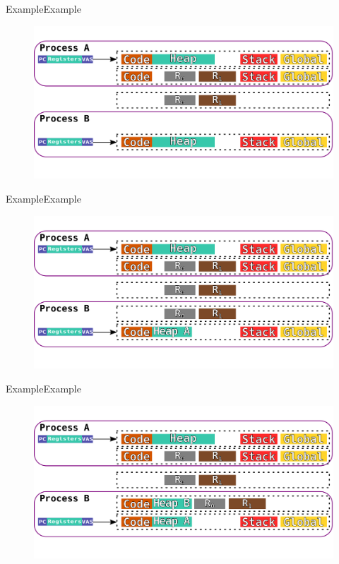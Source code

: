 \documentclass[10pt]{beamer}
\begin{document}
\begin{frame}{Example}{Example}
  \begin{figure}[ht]
    \centering
    \includegraphics[width=1\textwidth, keepaspectratio=true]{images/spacejmp_example_h.png}
  \end{figure}
\end{frame}

\begin{frame}{Example}{Example}
  \begin{figure}[ht]
    \centering
    \includegraphics[width=1\textwidth, keepaspectratio=true]{images/spacejmp_example_i.png}
  \end{figure}
\end{frame}

\begin{frame}{Example}{Example}
  \begin{figure}[ht]
    \centering
    \includegraphics[width=1\textwidth, keepaspectratio=true]{images/spacejmp_example_j.png}
  \end{figure}
\end{frame}
\end{document}
